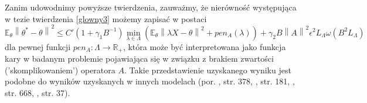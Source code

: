 \documentclass[man,mfiu]{mgrwms}
\newcommand{\norm}[1]{\left\lVert#1\right\rVert}
\begin{document}
Zanim udowodnimy powyższe twierdzenia, zauważmy, że nierówność występująca w tezie twierdzenia \ref{glowny3} możemy zapisać w postaci
\begin{displaymath}
\mathbb{E}_{\theta}\norm{\theta^*-\theta}^2\leq C'(1+\gamma_1B^{-1})\min_{\lambda\in \Lambda}\left(\mathbb{E}_{\theta}\norm{\lambda X-\theta}^2+pen_A(\lambda)\right)+\gamma_2B\norm{A}^2\epsilon^2L_{\Lambda}\omega(B^2L_{\Lambda})
\end{displaymath}
dla pewnej funkcji $pen_A\colon \Lambda \to \mathbb{R}_+$, która może być interpretowana jako funkcja kary w badanym problemie pojawiająca się w związku z brakiem zwartości ('skomplikowaniem') operatora $A$. Takie przedstawienie uzyskanego wyniku jest podobne do wyników uzyskanych w innych modelach (por. \cite{barron}, str. 378, \cite{loubes}, str. 181, \cite{loubes}, str. 668, \cite{giraud}, str. 37).
\end{document}
